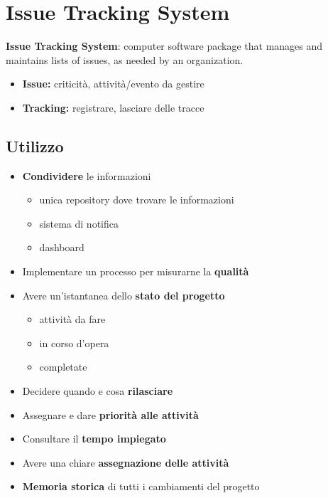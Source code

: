 \section{Issue Tracking System}

\begin{mdframed}
    \textbf{Issue Tracking System}: computer software package that manages and maintains lists of issues, as needed by an organization.
\end{mdframed}
\begin{itemize}
    \item \textbf{Issue:} criticità, attività/evento da gestire
    \item \textbf{Tracking:} registrare, lasciare delle tracce
\end{itemize}

\subsection{Utilizzo}
\begin{itemize}
    \item \textbf{Condividere} le informazioni
    \begin{itemize}
        \item unica repository dove trovare le informazioni
        \item sistema di notifica
        \item dashboard
    \end{itemize}
    \item Implementare un processo per misurarne la \textbf{qualità}
    \item Avere un'istantanea dello \textbf{stato del progetto}
    \begin{itemize}
        \item attività da fare
        \item in corso d’opera
        \item completate
    \end{itemize}
    \item Decidere quando e cosa \textbf{rilasciare}
    \item Assegnare e dare \textbf{priorità alle attività}
    \item Consultare il \textbf{tempo impiegato}
    \item Avere una chiare \textbf{assegnazione delle attività}
    \item \textbf{Memoria storica} di tutti i cambiamenti del progetto
\end{itemize}


